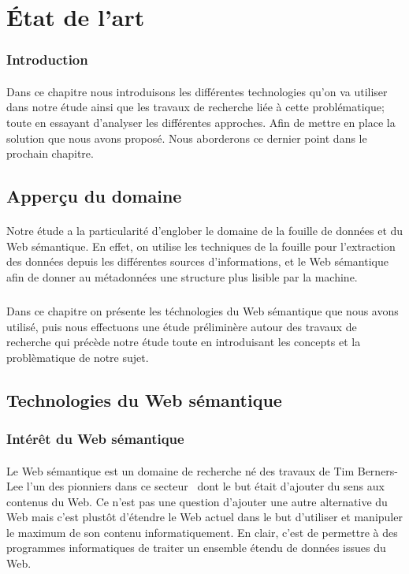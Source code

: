 \documentclass[12pt,a4	]{report}
\begin{document}
\section*{État de l'art}
\subsubsection*{Introduction}
\paragraph{}
Dans ce chapitre nous introduisons les différentes technologies qu'on va utiliser dans notre étude ainsi que les travaux de recherche liée à cette problématique; toute en essayant d'analyser les différentes approches. Afin de mettre en place la solution que nous avons proposé.  Nous aborderons ce dernier point dans le prochain chapitre.

\subsection*{Apperçu du domaine}
\paragraph{}
Notre étude a la particularité d’englober le domaine de la fouille de données et du Web sémantique. 
En effet, on utilise les techniques de la fouille pour l'extraction des données depuis les différentes sources d'informations, et le Web sémantique afin de donner au métadonnées une structure plus lisible par la machine.
\subparagraph{}
Dans ce chapitre on présente les téchnologies du Web sémantique que nous avons utilisé, puis nous effectuons une étude préliminère autour des travaux de recherche qui précède notre étude toute en introduisant les concepts et la problèmatique de notre sujet.
\subsection*{Technologies du Web sémantique}
\subsubsection*{Intérêt du Web sémantique}
\paragraph{}
Le Web sémantique est un domaine de recherche né des travaux de Tim Berners-Lee l'un des pionniers dans ce secteur~\cite{Berners-lee2001} dont le but était d'ajouter du sens aux contenus du Web. Ce n'est pas une question d'ajouter une autre alternative du Web mais c'est plustôt d'étendre le Web actuel dans le but d'utiliser et manipuler le maximum de son contenu informatiquement. En clair, c'est de permettre à des programmes informatiques de traiter un ensemble étendu de données issues du Web.
\end{document}
